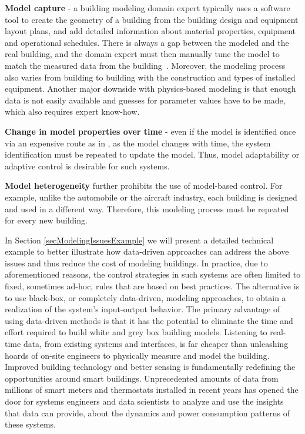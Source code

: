 \begin{enumerate}
	\item \textcolor[rgb]{0,0,1}{\textbf{Model capture} - a building modeling domain expert typically uses a software tool to create the geometry of a building from the building design and equipment layout plans, and add detailed information about material properties, equipment and operational schedules.
	There is always a gap between the modeled and the real building, and the domain expert must then manually tune the model to match the measured data from the building~\cite{New2012}. 
	Moreover, the modeling process also varies from building to building with the construction and types of installed equipment.
	Another major downside with physics-based modeling is that enough data is not easily available and guesses for parameter values have to be made, which also requires expert know-how.
	\item \textbf{Change in model properties over time} - even if the model is identified once via an expensive route as in \cite{Sturzenegger2016}, as the model changes with time, the system identification must be repeated to update the model. Thus, model adaptability or adaptive control is desirable for such systems.
	\item \textbf{Model heterogeneity} further prohibits the use of model-based control. For example, unlike the automobile or the aircraft industry, each building is designed and used in a different way. Therefore, this modeling process must be repeated for every new building. }
\end{enumerate}

\textcolor[rgb]{0,0,1}{
In Section \ref{secModelingIssuesExample} we will present a detailed technical example to better illustrate how data-driven approaches can address the above issues and thus reduce the cost of modeling buildings. In practice, due to aforementioned reasons, the control strategies in such systems are often limited to fixed, sometimes ad-hoc, rules that are based on best practices. 
The alternative is to use black-box, or completely data-driven, modeling approaches, to obtain a realization of the system's input-output behavior. 
The primary advantage of using data-driven methods is that it has the potential to eliminate the time and effort required to build white and grey box building models. 
Listening to real-time data, from existing systems and interfaces, is far cheaper than unleashing hoards of on-site engineers to physically measure and model the building. Improved building technology and better sensing is fundamentally redefining the opportunities around smart buildings. 
Unprecedented amounts of data from millions of smart meters and thermostats installed in recent years has opened the door for systems engineers and data scientists to analyze and use the insights that data can provide, about the dynamics and power consumption patterns of these systems. }

